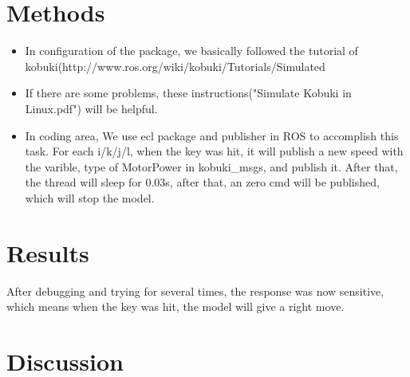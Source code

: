 \documentclass[preprint,pre,floats,aps,amsmath,amssymb]{revtex4}
\begin{document}
\section{Methods}
\label{sec:methods}

\begin{itemize}
\item In configuration of the package, we basically followed the tutorial of kobuki(http://www.ros.org/wiki/kobuki/Tutorials/Simulated%

\item If there are some problems, these instructions("Simulate Kobuki in Linux.pdf") will be helpful.

\item In coding area, We use ecl package and publisher in ROS to accomplish this task. For each i/k/j/l, when the key was hit, it will publish a new speed with the varible, type of MotorPower in kobuki\_msgs, and publish it. After that, the thread will sleep for 0.03s, after that, an zero cmd will be published, which will stop the model.

\end{itemize}

\section{Results}
\label{sec:results}

After debugging and trying for several times, the response was now sensitive, which means when the key was hit, the model will give a right move.

\section{Discussion}
\label{sec:discussion}
\end{document}

